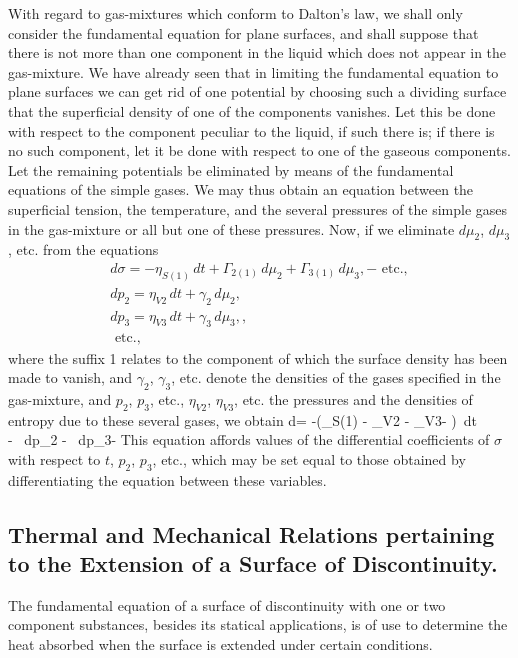 \documentclass[12pt]{article}
\begin{document}
{With regard to gas-mixtures which conform to Dalton's law, we shall only consider the fundamental equation for plane surfaces, and shall suppose that there is not more than one component in the liquid which does not appear in the gas-mixture. We have already seen that in limiting the fundamental equation to plane surfaces we can get rid of one potential by choosing such a dividing surface that the superficial density of one of the components vanishes. Let this be done with respect to the component peculiar to the liquid, if such there is; if there is no such component, let it be done with respect to one of the gaseous components. Let the remaining potentials be eliminated by means of the fundamental equations of the simple gases. We may thus obtain an equation between the superficial tension, the temperature, and the several pressures of the simple gases in the gas-mixture or all but one of these pressures. Now, if we eliminate $d\mu_2$, $d\mu_3$, etc. from the equations
\begin{gather*}
d\sigma =  -\eta_{S(1)} \,dt + \Gamma_{2(1)} \, d\mu_2 +\Gamma_{3(1)} \, d\mu_3,- \text{ etc.}, \\
dp_2 = \eta_{V2}\, dt+ \gamma_2\, d\mu_2, \\ 
dp_3 = \eta_{V3}\, dt+ \gamma_3\, d\mu_3,, \\
\text{ etc.}, \end{gather*}
where the suffix 1 relates to the component of which the surface density has been made to vanish, and $\gamma_2$, $\gamma_3$, etc. denote the densities of the gases specified in the gas-mixture, and $p_2$, $p_3$, etc., $\eta_{V2}$, $\eta_{V3}$, etc. the pressures and the densities of entropy due to these several gases, we obtain
\eqs d\sigma= -\left(\eta_{S(1)} - \eta_{V2}  - \eta_{V3}- \right)\, dt \\
- \, dp_2 - \, dp_3-   \label{585} \eqe
This equation affords values of the differential coefficients of $\sigma$ with respect to $t$, $p_2$, $p_3$, etc., which may be set equal to those obtained by differentiating the equation between these variables.
\subsection{Thermal and Mechanical Relations pertaining to the Extension of a Surface of Discontinuity.}
The fundamental equation of a surface of discontinuity with one or two component substances, besides its statical applications, is of use to determine the heat absorbed when the surface is extended under certain conditions.


}
\end{document}
